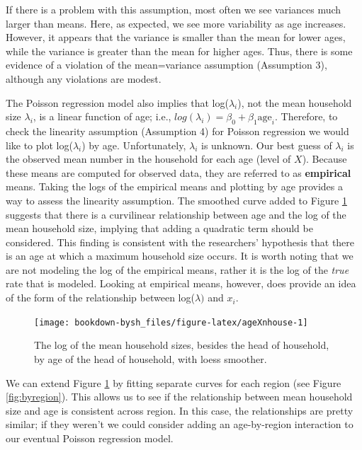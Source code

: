 \documentclass[
]{krantz}
\begin{document}
If there is a problem with this assumption, most often we see variances much larger than means. Here, as expected, we see more variability as age increases. However, it appears that the variance is smaller than the mean for lower ages, while the variance is greater than the mean for higher ages. Thus, there is some evidence of a violation of the mean=variance assumption (Assumption 3), although any violations are modest.

The Poisson regression model also implies that log(\(\lambda_i\)), not the mean household size \(\lambda_i\), is a linear function of age; i.e., \(log(\lambda_i)=\beta_0+\beta_1\textrm{age}_i\). Therefore, to check the linearity assumption (Assumption 4) for Poisson regression we would like to plot log(\(\lambda_i\)) by age. Unfortunately, \(\lambda_i\) is unknown. Our best guess of \(\lambda_i\) is the observed mean number in the household for each age (level of \(X\)). Because these means are computed for observed data, they are referred to as \textbf{empirical} means. Taking the logs of the empirical means and plotting by age provides a way to assess the linearity assumption. The smoothed curve added to Figure \ref{fig:ageXnhouse} suggests that there is a curvilinear relationship between age and the log of the mean household size, implying that adding a quadratic term should be considered. This finding is consistent with the researchers' hypothesis that there is an age at which a maximum household size occurs. It is worth noting that we are not modeling the log of the empirical means, rather it is the log of the \emph{true} rate that is modeled. Looking at empirical means, however, does provide an idea of the form of the relationship between log(\(\lambda)\) and \(x_i\).

\begin{figure}

{\centering \texttt{[image: bookdown-bysh\_files/figure-latex/ageXnhouse-1]} 

}

\caption{The log of the mean household sizes, besides the head of household, by age of the head of household, with loess smoother.}\label{fig:ageXnhouse}
\end{figure}

We can extend Figure \ref{fig:ageXnhouse} by fitting separate curves for each region (see Figure \ref{fig:byregion}). This allows us to see if the relationship between mean household size and age is consistent across region. In this case, the relationships are pretty similar; if they weren't we could consider adding an age-by-region interaction to our eventual Poisson regression model.
\end{document}
